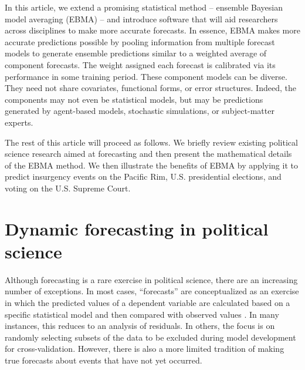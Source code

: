 \documentclass[12pt,fullpage]{article}
\begin{document}
In this article, we extend a promising statistical method -- ensemble
Bayesian model averaging (EBMA) -- and introduce software that will
aid researchers across disciplines to make more accurate forecasts.
In essence, EBMA makes more accurate predictions possible by pooling
information from multiple forecast models to generate ensemble
predictions similar to a weighted average of component forecasts. The
weight assigned each forecast is calibrated via its performance in
some training period.  These component models can be diverse.  They
need not share covariates, functional forms, or error
structures. Indeed, the components may not even be statistical models,
but may be predictions generated by agent-based models, stochastic
simulations, or subject-matter experts.

The rest of this article will proceed as follows. We briefly review
existing political science research aimed at forecasting and then
present the mathematical details of the EBMA method. We then
illustrate the benefits of EBMA by applying it to predict insurgency
events on the Pacific Rim, U.S. presidential elections, and voting on
the U.S. Supreme Court.

\section{Dynamic forecasting in political science}
Although forecasting is a rare exercise in political science, there
are an increasing number of exceptions.  In most cases, ``forecasts''
are conceptualized as an exercise in which the predicted values of a
dependent variable are calculated based on a specific statistical
model and then compared with observed values
\citep[e.g.,][]{Hildebrand:etal:1976}. In many instances, this reduces
to an analysis of residuals.  In others, the focus is on randomly
selecting subsets of the data to be excluded during model development
for cross-validation.  However, there is also a more limited tradition
of making true forecasts about events that have not yet occurred.
\end{document}
